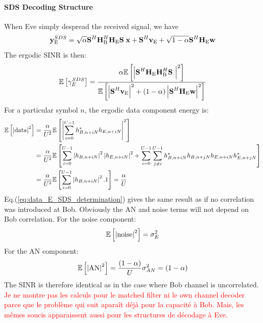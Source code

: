 \documentclass[12pt]{article}
\begin{document}
\paragraph*{SDS Decoding Structure}
When Eve simply despread the received signal, we have
\begin{equation}
\textbf{y}_{\text{E}}^{SDS} = \sqrt{\alpha}\textbf{S}^H  \textbf{H}_{\text{B}}^H \textbf{H}_{\text{E}} \textbf{S}\; \textbf{x} +  \textbf{S}^H \textbf{v}_\text{E} + \sqrt{1-\alpha} \textbf{S}^H \textbf{H}_{\text{E}}\textbf{w}
\label{eq:rx_SDS_eve}
\end{equation}
The ergodic SINR is then:
\begin{equation}
\mathbb{E} \left[\gamma_E^{SDS}\right] = \frac{\alpha\mathbb{E} \left[\left| \textbf{S}^H  \textbf{H}_{\text{E}}\textbf{H}_{\text{B}}^H\textbf{S}\ \right|^2\right]}{ \mathbb{E} \left[\left|  \textbf{S}^H \textbf{v}_\text{E}\right|^2 + (1-\alpha)  \left| \textbf{S}^H  \textbf{H}_{\text{E}} \textbf{w} \right|^2 \right]} \\
\label{eq:expected_sinr_SDS_e}
\end{equation}
For a particular symbol $n$, the ergodic data component energy is:
\begin{equation}
\begin{split}
\mathbb{E} \left[\left| \text{data}\right|^2\right] &=  \frac{\alpha}{U^2} \mathbb{E} \left[\left|\sum_{i=0}^{U-1} h^*_{B,n+iN}h_{E,n+iN}\right|^2\right] \\
&=  \frac{\alpha}{U^2} \mathbb{E} \left[\sum_{i=0}^{U-1} \left|h_{B,n+iN}\right|^2 \left|h_{E,n+iN}\right|^2 + \sum_{i=0}^{U-1}\sum_{j \neq i}^{U-1} h^*_{B,n+iN}  h_{B,n+jN} h_{E,n+iN}  h^*_{E,n+jN} \right] \\
&= \frac{\alpha}{U^2} \mathbb{E} \left[\sum_{i=0}^{U-1} \left|h_{B,n+iN}\right|^2 .1\right] = \frac{\alpha}{U}
\label{eq:data_E_SDS_determination}
\end{split}
\end{equation}
Eq.(\ref{eq:data_E_SDS_determination}) gives the same result as if no correlation was introduced at Bob. Obviously the AN and noise terms will not depend on Bob correlation. 
For the noise component: 
\begin{equation}
\mathbb{E} \left[\left| \text{noise}\right|^2\right] = \sigma^2_{E}
\label{eq:noise_e_SDS_determination}
\end{equation}
For the AN component:
\begin{equation}
\mathbb{E} \left[\left| \text{AN}\right|^2\right] = \frac{(1-\alpha)}{U} \sigma_{AN}^2 = (1-\alpha)
\label{eq:noise_an_SDS_determination}
\end{equation}
The SINR is therefore identical as in the case where Bob channel is uncorrelated.\\

\textcolor{red}{Je ne montre pas les calculs pour le matched filter ni le own channel decoder parce que le problème qui suit aparaît déjà pour la capacité à Bob. Mais, les mêmes soucis apparaissent aussi pour les structures de décodage à Eve.}
\end{document}
